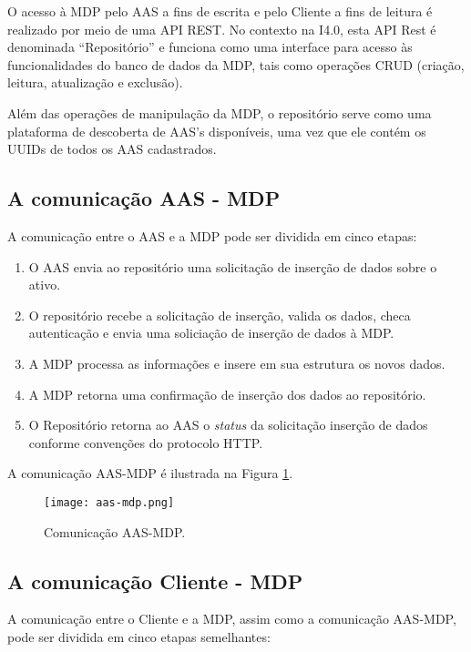 	O acesso à MDP pelo AAS a fins de escrita e pelo Cliente a fins de leitura é realizado por meio de uma API REST. No contexto na I4.0, esta API Rest é denominada ``Repositório'' e funciona como uma interface para acesso às funcionalidades do banco de dados da MDP, tais como operações CRUD (criação, leitura, atualização e exclusão).
	
	Além das operações de manipulação da MDP, o repositório serve como uma plataforma de descoberta de AAS's disponíveis, uma vez que ele contém os UUIDs de todos os AAS cadastrados.
	
	
	\subsection{A comunicação AAS - MDP}
	
	A comunicação entre o AAS e a MDP pode ser dividida em cinco etapas:
	
	\begin{enumerate}
		\item O AAS envia ao repositório uma solicitação de inserção de dados sobre o ativo.
		\item O repositório recebe a solicitação de inserção, valida os dados, checa autenticação e envia uma soliciação de inserção de dados à MDP.
		\item A MDP processa as informações e insere em sua estrutura os novos dados.
		\item A MDP retorna uma confirmação de inserção dos dados ao repositório.
		\item O Repositório retorna ao AAS o \textit{status} da solicitação inserção de dados conforme convenções do protocolo HTTP.
	\end{enumerate}
	
	
	A comunicação AAS-MDP é ilustrada na Figura \ref{fig:aas-mdp}.
	
	
	\begin{figure}[H]
		\centering
		\caption{Comunicação AAS-MDP.}
		\texttt{[image: aas-mdp.png]}
		\label{fig:aas-mdp}
	\end{figure}

	
	\subsection{A comunicação Cliente - MDP}
	
	A comunicação entre o Cliente e a MDP, assim como a comunicação AAS-MDP, pode ser dividida em cinco etapas semelhantes:
	
